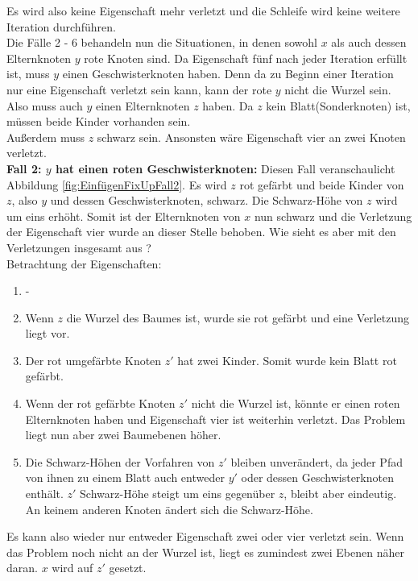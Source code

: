 \documentclass[a4paper,12pt]{article}
\begin{document}
\noindent Es wird also keine Eigenschaft mehr verletzt und die Schleife wird keine weitere Iteration durchführen.\\
Die Fälle 2 - 6 behandeln nun die Situationen, in denen sowohl $x$ als auch dessen Elternknoten $y$ rote Knoten sind. Da Eigenschaft fünf nach jeder Iteration erfüllt ist, muss $y$ einen Geschwisterknoten haben. Denn da zu Beginn einer Iteration nur eine Eigenschaft verletzt sein kann, kann der rote $y$ nicht die Wurzel sein. Also muss auch $y$ einen Elternknoten $z$ haben. Da $z$ kein Blatt(Sonderknoten) ist, müssen beide Kinder vorhanden sein.\\
Außerdem muss $z$ schwarz sein. Ansonsten wäre Eigenschaft vier an zwei Knoten verletzt.\\

\noindent\textbf{Fall 2: $y$ hat einen roten Geschwisterknoten: } \label{if2}
\noindent Diesen Fall veranschaulicht Abbildung \ref{fig:EinfügenFixUpFall2}. Es wird $z$ rot gefärbt und beide Kinder von $z$, also $y$ und dessen Geschwisterknoten, schwarz. Die Schwarz-Höhe von $z$ wird um eins erhöht. Somit ist der Elternknoten von $x$ nun schwarz und die Verletzung der Eigenschaft vier wurde an dieser Stelle behoben. Wie sieht es aber mit den Verletzungen insgesamt aus ? \\

Betrachtung der Eigenschaften:

\begin{enumerate}
	\item -
	\item Wenn $z$ die Wurzel des Baumes ist, wurde sie rot gefärbt und eine Verletzung liegt vor.
	\item Der rot umgefärbte Knoten $z'$ hat zwei Kinder. Somit wurde kein Blatt rot gefärbt.
	\item  Wenn der rot gefärbte Knoten $z'$ nicht die Wurzel ist, könnte er einen roten Elternknoten haben und Eigenschaft vier ist weiterhin verletzt. Das Problem liegt nun aber zwei Baumebenen höher.
	\item  Die Schwarz-Höhen der Vorfahren von $z'$ bleiben unverändert, da jeder Pfad von ihnen zu einem Blatt auch entweder $y'$ oder dessen Geschwisterknoten enthält. $z'$ Schwarz-Höhe steigt um eins gegenüber $z$, bleibt aber eindeutig. An keinem anderen Knoten ändert sich die Schwarz-Höhe. 
	
\end{enumerate} 
Es kann also wieder nur entweder Eigenschaft zwei oder vier verletzt sein. Wenn das Problem noch nicht an der Wurzel ist, liegt es zumindest zwei Ebenen näher daran. $x$ wird auf $z'$ gesetzt. 
\end{document}
